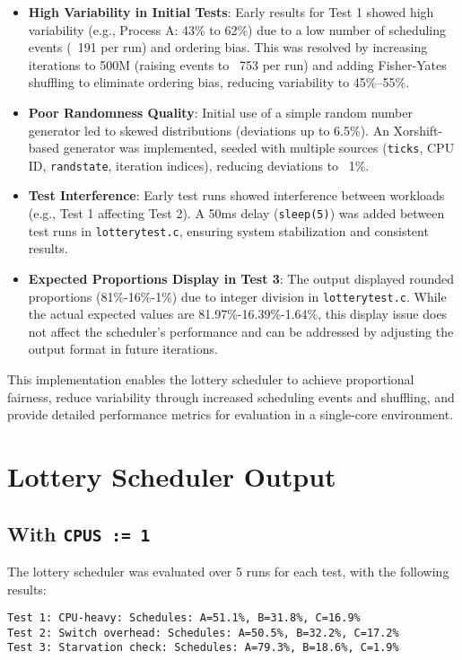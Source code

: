 \documentclass{article}
\begin{document}
\begin{itemize}
    \item \textbf{High Variability in Initial Tests}: Early results for Test 1 showed high variability (e.g., Process A: 43\% to 62\%) due to a low number of scheduling events (~191 per run) and ordering bias. This was resolved by increasing iterations to 500M (raising events to ~753 per run) and adding Fisher-Yates shuffling to eliminate ordering bias, reducing variability to 45\%–55\%.
    \item \textbf{Poor Randomness Quality}: Initial use of a simple random number generator led to skewed distributions (deviations up to 6.5\%). An Xorshift-based generator was implemented, seeded with multiple sources (\texttt{ticks}, CPU ID, \texttt{randstate}, iteration indices), reducing deviations to ~1\%.
    \item \textbf{Test Interference}: Early test runs showed interference between workloads (e.g., Test 1 affecting Test 2). A 50ms delay (\texttt{sleep(5)}) was added between test runs in \texttt{lotterytest.c}, ensuring system stabilization and consistent results.
    \item \textbf{Expected Proportions Display in Test 3}: The output displayed rounded proportions (81\%-16\%-1\%) due to integer division in \texttt{lotterytest.c}. While the actual expected values are 81.97\%-16.39\%-1.64\%, this display issue does not affect the scheduler’s performance and can be addressed by adjusting the output format in future iterations.
\end{itemize}

This implementation enables the lottery scheduler to achieve proportional fairness, reduce variability through increased scheduling events and shuffling, and provide detailed performance metrics for evaluation in a single-core environment.

\section{Lottery Scheduler Output}
\subsection{With \texttt{CPUS := 1}}
The lottery scheduler was evaluated over 5 runs for each test, with the following results:

\begin{lstlisting}[breaklines=true]
Test 1: CPU-heavy: Schedules: A=51.1%, B=31.8%, C=16.9%
Test 2: Switch overhead: Schedules: A=50.5%, B=32.2%, C=17.2%
Test 3: Starvation check: Schedules: A=79.3%, B=18.6%, C=1.9%
\end{lstlisting}
\end{document}
